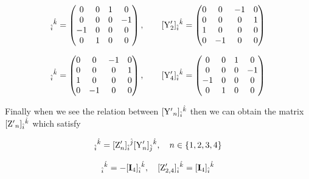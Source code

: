 \documentclass[12pt]{article}
\let\bm\relax
\newcommand{\bm}[1]{{\boldsymbol{#1}}}
\begin{document}
\begin{equation}
[{\bm{\rm Y}}'_1]_{\hat i}{}^{\hat k}=
\begin{pmatrix}
0 & 0 & 1 & 0 \\
0 & 0 & 0 & -1 \\
-1 & 0 & 0 & 0 \\
0 & 1 & 0 & 0 \\
\end{pmatrix}
,\quad\quad
[{\bm{\rm Y}}'_2]_{\hat i}{}^{\hat k}=
\begin{pmatrix}
0 & 0 & -1 & 0 \\
0 & 0 & 0 & 1 \\
1 & 0 & 0 & 0 \\
0 & -1 & 0 & 0 \\
\end{pmatrix}
\end{equation}

\begin{equation}
[{\bm{\rm Y}}'_3]_{\hat i}{}^{\hat k}=
\begin{pmatrix}
0 & 0 & -1 & 0 \\
0 & 0 & 0 & 1 \\
1 & 0 & 0 & 0 \\
0 & -1 & 0 & 0 \\
\end{pmatrix}
,\quad\quad
[{\bm{\rm Y}}'_4]_{\hat i}{}^{\hat k}=
\begin{pmatrix}
0 & 0 & 1 & 0 \\
0 & 0 & 0 & -1 \\
-1 & 0 & 0 & 0 \\
0 & 1 & 0 & 0 \\
\end{pmatrix}
\end{equation}

Finally when we see the relation between $[{\bm{\rm Y'}}_n]_{\hat i}{}^{\hat k}$ then we can obtain the matrix $[{\bm{\rm Z'}}_n]_{\hat i}{}^{\hat k}$ which satisfy

\begin{equation}
[{\bm{\rm Y}}'_{n+1}]_{\hat i}{}^{\hat k}=[{\bm{\rm Z}}'_n]_{\hat i}{}^{\hat j}[{\bm{\rm Y}}'_n]_{\hat j}{}^{\hat k},\quad n\in\{1,2,3,4\}
\label{eq29}
\end{equation}

\begin{equation}
[{\bm{\rm Z}}'_{1,3}]_{\hat i}{}^{\hat k}=-[\mathbf{I}_4]_{\hat i}{}^{\hat k},\quad [{\bm{\rm Z}}'_{2,4}]_{\hat i}{}^{\hat k}=[\mathbf{I}_4]_{\hat i}{}^{\hat k}
\end{equation}
\end{document}
